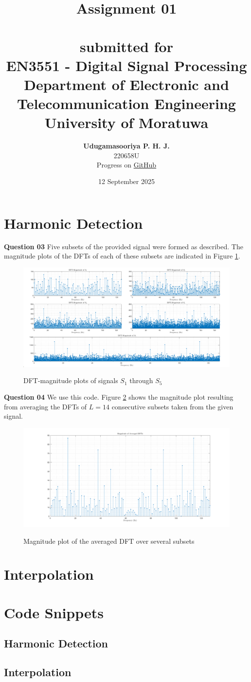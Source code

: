 \documentclass{article}[a4paper]
\title{
	\huge{\textbf{
		Assignment 01
	}}\\
	\large{\phantom{}}\\
	\large{
		submitted for
	}\\
	\Large{
		\textbf{EN3551 - Digital Signal Processing}
	}\\
	\large{
		Department of Electronic and Telecommunication Engineering
	}
	\\
	\large{University of Moratuwa}
}
\author{
	\textbf{Udugamasooriya P. H. J.}\\
	220658U\\
	\small{Progress on \href{https://github.com/pulasthi-u/en3150-assignment01}{GitHub \extlink}}
}
\date{12 September 2025}
\begin{document}
	\maketitle
	
	\section{Harmonic Detection}
	
	\textbf{Question 03} Five subsets of the provided signal were formed as described. The magnitude plots of the DFTs of each of these subsets are indicated in Figure \ref{subset_dfts}.
	
	\begin{figure}[H]
		\centering
		\includegraphics[width=\linewidth]{images/q1_3_1.png}
		\label{subset_dfts}
		\caption{DFT-magnitude plots of signals $S_1$ through $S_5$}
	\end{figure}
	
	\textbf{Question 04} We use this code. Figure \ref{avg_dft} shows the magnitude plot resulting from averaging the DFTs of $L = 14$ consecutive subsets taken from the given signal.
	
	\begin{figure}[H]
		\centering
		\includegraphics[width=\linewidth]{images/q1_3_2.png}
		\label{avg_dft}
		\caption{Magnitude plot of the averaged DFT over several subsets}
	\end{figure} 
	
	\section{Interpolation}
	
	\appendix
	\section{Code Snippets}
	\label{code}
	
	\subsection{Harmonic Detection}
	
	\subsection{Interpolation}
	
\end{document}
